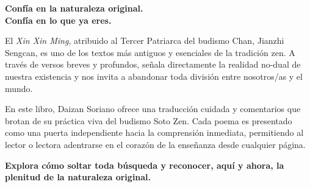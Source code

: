 \documentclass[
  a5paperpaper,
]{article}
\begin{document}
\textbf{Confía en la naturaleza original.\\
Confía en lo que ya eres.}

El \emph{Xin Xin Ming}, atribuido al Tercer Patriarca del budismo Chan,
Jianzhi Sengcan, es uno de los textos más antiguos y esenciales de la
tradición zen. A través de versos breves y profundos, señala
directamente la realidad no-dual de nuestra existencia y nos invita a
abandonar toda división entre nosotros/as y el mundo.

En este libro, Daizan Soriano ofrece una traducción cuidada y
comentarios que brotan de su práctica viva del budismo Soto Zen. Cada
poema es presentado como una puerta independiente hacia la comprensión
inmediata, permitiendo al lector o lectora adentrarse en el corazón de
la enseñanza desde cualquier página.

\textbf{Explora cómo soltar toda búsqueda y reconocer, aquí y ahora, la
plenitud de la naturaleza original.}
\end{document}
